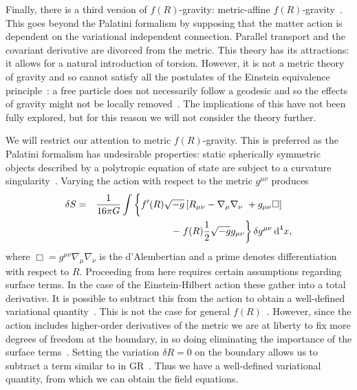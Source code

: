 \documentclass[aps,prd,amsfonts,amssymb,amsmath,nofootinbib,reprint,showpacs]{revtex4-1}
\newcommand{\dd}{\ensuremath{\text{d}}}
\newcommand{\recip}[1]{\ensuremath{\frac{1}{#1}}}
\begin{document}
Finally, there is a third version of $f(R)$-gravity: metric-affine $f(R)$-gravity~\cite{Sotiriou2007, Sotiriou2007b}. This goes beyond the Palatini formalism by supposing that the matter action is dependent on the variational independent connection. Parallel transport and the covariant derivative are divorced from the metric. This theory has its attractions: it allows for a natural introduction of torsion. However, it is not a metric theory of gravity and so cannot satisfy all the postulates of the Einstein equivalence principle~\cite{Will2006}: a free particle does not necessarily follow a geodesic and so the effects of gravity might not be locally removed~\cite{Exirifard2008}. The implications of this have not been fully explored, but for this reason we will not consider the theory further.

We will restrict our attention to metric $f(R)$-gravity. This is preferred as the Palatini formalism has undesirable properties: static spherically symmetric objects described by a polytropic equation of state are subject to a curvature singularity~\cite{Barausse2008b, Barausse2008a}. Varying the action with respect to the metric $g^{\mu\nu}$ produces
\begin{eqnarray}
\delta S & = & \recip{16\pi G}\int\left\{f'(R)\sqrt{-g}\left[R_{\mu\nu} - \nabla_\mu\nabla_\nu\ + g_{\mu\nu}\Box\right] \hphantom{\frac{0}{0}} \vphantom{\frac{0}{0}} \right. \nonumber \\*
 & & - \left. f(R)\recip{2}\sqrt{-g}g_{\mu\nu}\right\}\delta g^{\mu\nu}\,\dd^4x,
\end{eqnarray}
where $\Box = g^{\mu\nu}\nabla_\mu\nabla_\nu$ is the d'Alembertian and a prime denotes differentiation with respect to $R$. Proceeding from here requires certain assumptions regarding surface terms. In the case of the Einstein-Hilbert action these gather into a total derivative. It is possible to subtract this from the action to obtain a well-defined variational quantity~\cite{York1972, Gibbons1977}. This is not the case for general $f(R)$~\cite{Madsen1989}. However, since the action includes higher-order derivatives of the metric we are at liberty to fix more degrees of freedom at the boundary, in so doing eliminating the importance of the surface terms~\cite{Dyer2009a, Sotiriou2010}. Setting the variation $\delta R = 0$ on the boundary allows us to subtract a term similar to in GR~\cite{Guarnizo2010}. Thus we have a well-defined variational quantity, from which we can obtain the field equations.
\end{document}
